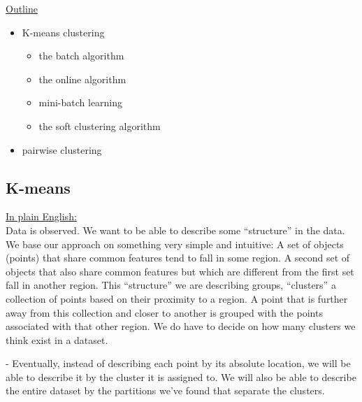 

\begin{frame}
\underline{Outline}
\begin{itemize}
\item K-means clustering
    \begin{itemize}
    \item the batch algorithm
    \item the online algorithm
    \item mini-batch learning
    \item the soft clustering algorithm
    \end{itemize}
\item pairwise clustering
\end{itemize}
\end{frame}

\begin{frame}
\section{K-means}

\underline{In plain English:}\\

Data is observed. We want to be able to describe some ``structure'' in the data.
We base our approach on something very simple and intuitive: 
A set of 
objects (points) that share common features tend to fall in some region. A second set of objects that also share common features but which are different from the first set fall in another region.
This ``structure'' we are describing groups, ``clusters'' a collection of points based on their proximity to a region.  
A point that is further away from this collection and closer to another is grouped with the points associated with that other region. 
We do have to decide on how many clusters we think exist in a dataset.

 
- Eventually, instead of describing each point by its absolute location, we will be able to describe it by the cluster it is assigned to. 
We will also be able to describe the entire dataset by the partitions we've found that separate the clusters.

\end{frame}
